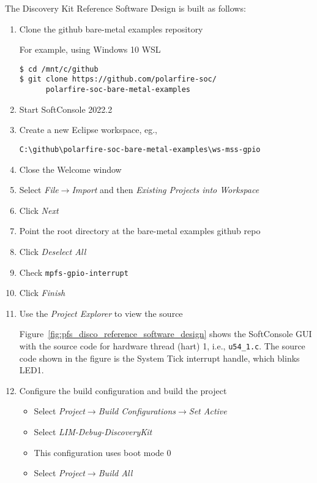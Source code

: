 The Discovery Kit Reference Software Design is built as follows:
%
\begin{enumerate}
\item Clone the github bare-metal examples repository

For example, using Windows 10 WSL
%
\begin{verbatim}
$ cd /mnt/c/github
$ git clone https://github.com/polarfire-soc/
      polarfire-soc-bare-metal-examples
\end{verbatim}

\item Start SoftConsole 2022.2

\item Create a new Eclipse workspace, eg.,

\begin{verbatim}
C:\github\polarfire-soc-bare-metal-examples\ws-mss-gpio
\end{verbatim}

\item Close the Welcome window

\item Select \emph{File$\rightarrow$Import} and then \emph{Existing Projects into Workspace}

\item Click \emph{Next}

\item Point the root directory at the bare-metal examples github repo

\item Click \emph{Deselect All}

\item Check \texttt{mpfs-gpio-interrupt}

\item Click \emph{Finish}

\item Use the \emph{Project Explorer} to view the source

Figure~\ref{fig:pfs_disco_reference_software_design} shows the SoftConsole GUI
with the source code for hardware thread (hart) 1, i.e., \verb+u54_1.c+.
The source code shown in the figure is the System Tick interrupt handle,
which blinks LED1.

\item Configure the build configuration and build the project
%
\begin{itemize}
\item Select \emph{Project$\rightarrow$Build Configurations$\rightarrow$Set Active}
\item Select \emph{LIM-Debug-DiscoveryKit}
\item This configuration uses boot mode 0
\item Select \emph{Project$\rightarrow$Build All}
\end{itemize}


\end{enumerate}
